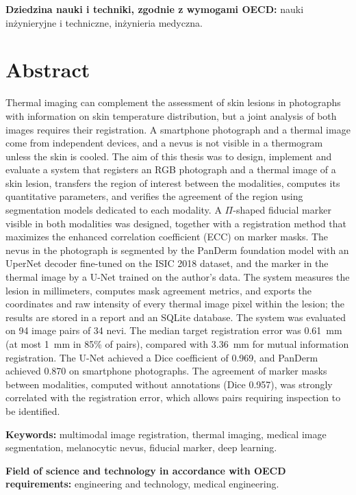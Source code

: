 \noindent\textbf{Dziedzina nauki i techniki, zgodnie z wymogami OECD:} nauki inżynieryjne i techniczne, inżynieria medyczna. %

\chapter*{Abstract}

Thermal imaging can complement the assessment of skin lesions in photographs with information on skin temperature distribution, but a joint analysis of both images requires their registration. A smartphone photograph and a thermal image come from independent devices, and a nevus is not visible in a thermogram unless the skin is cooled. The aim of this thesis was to design, implement and evaluate a system that registers an RGB photograph and a thermal image of a skin lesion, transfers the region of interest between the modalities, computes its quantitative parameters, and verifies the agreement of the region using segmentation models dedicated to each modality. A $\Pi$-shaped fiducial marker visible in both modalities was designed, together with a registration method that maximizes the enhanced correlation coefficient (ECC) on marker masks. The nevus in the photograph is segmented by the PanDerm foundation model with an UperNet decoder fine-tuned on the ISIC 2018 dataset, and the marker in the thermal image by a U-Net trained on the author's data. The system measures the lesion in millimeters, computes mask agreement metrics, and exports the coordinates and raw intensity of every thermal image pixel within the lesion; the results are stored in a report and an SQLite database. The system was evaluated on 94 image pairs of 34 nevi. The median target registration error was 0.61~mm (at most 1~mm in 85\% of pairs), compared with 3.36~mm for mutual information registration. The U-Net achieved a Dice coefficient of 0.969, and PanDerm achieved 0.870 on smartphone photographs. The agreement of marker masks between modalities, computed without annotations (Dice 0.957), was strongly correlated with the registration error, which allows pairs requiring inspection to be identified.

\vspace{1em}
\noindent\textbf{Keywords:} multimodal image registration, thermal imaging, medical image segmentation, melanocytic nevus, fiducial marker, deep learning.

\noindent\textbf{Field of science and technology in accordance with OECD requirements:} engineering and technology, medical engineering. %
